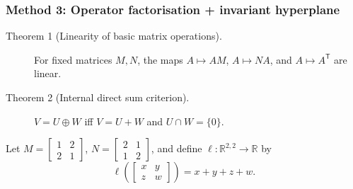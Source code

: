 \documentclass[12pt]{article}
\newcommand{\R}{\mathbb{R}}
\begin{document}

\newpage

\subsubsection{Method 3: Operator factorisation + invariant hyperplane}

\begin{description}
    \item[Theorem 1 (Linearity of basic matrix operations).] 
    For fixed matrices $M,N$, the maps $A\mapsto AM$, $A\mapsto NA$, and $A\mapsto A^{\mathsf T}$ are linear.
    \item[Theorem 2 (Internal direct sum criterion).] 
    $V=U\oplus W$ iff $V=U+W$ and $U\cap W=\{0\}$.
\end{description}
\medskip


Let $M=\begin{bmatrix}1&2\\2&1\end{bmatrix}$, $N=\begin{bmatrix}2&1\\1&2\end{bmatrix}$, and define $\ell:\R^{2,2}\to\R$ by
\[
\ell\!\left(\begin{bmatrix}x&y\\z&w\end{bmatrix}\right)=x+y+z+w.
\]
\end{document}

